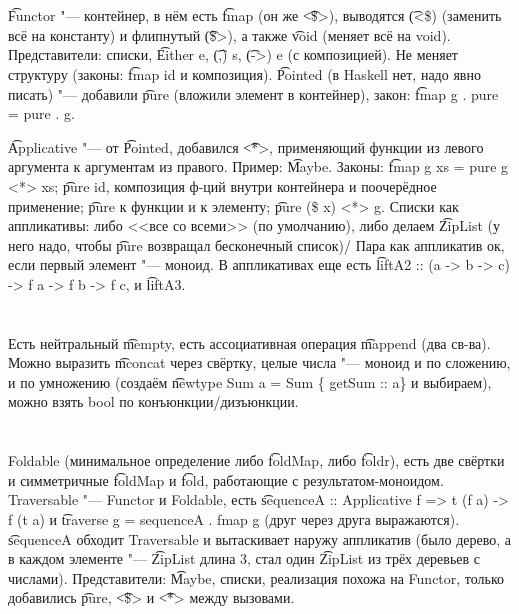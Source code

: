 \section{} %
\t{Functor} "--- контейнер, в нём есть \t{fmap} (он же \t{<\$>}), выводятся \t{(<\$)} (заменить всё на константу) и флипнутый
\t{(\$>)}, а также \t{void} (меняет всё на void).
Представители: списки, \t{Either e}, \t{(,) s}, \t{(->) e} (с композицией).
Не меняет структуру (законы: \t{fmap id} и композиция).
\t{Pointed} (в Haskell нет, надо явно писать) "--- добавили \t{pure} (вложили элемент в контейнер), закон: \t{fmap g . pure = pure . g}.

\t{Applicative} "--- от \t{Pointed}, добавился \t{<*>}, применяющий функции из левого аргумента к аргументам из правого.
Пример: \t{Maybe}.
Законы: \t{fmap g xs = pure g <*> xs}; \t{pure id}, композиция ф-ций внутри контейнера и поочерёдное применение;
\t{pure} к функции и к элементу; \t{pure (\$ x) <*> g}.
Списки как аппликативы: либо <<все со всеми>> (по умолчанию), либо делаем \t{ZipList} (у него надо, чтобы \t{pure} возвращал бесконечный список)/
Пара как аппликатив ок, если первый элемент "--- моноид.
В аппликативах еще есть \t{liftA2 :: (a -> b -> c) -> f a -> f b -> f c}, и \t{liftA3}.

\section{} %
Есть нейтральный \t{mempty}, есть ассоциативная операция \t{mappend} (два св-ва).
Можно выразить \t{mconcat} через свёртку, целые числа "--- моноид и по сложению,
и по умножению (создаём \t{newtype Sum a = Sum \{ getSum :: a\}} и выбираем),
можно взять bool по конъюнкции/дизъюнкции.

\section{} %
Foldable (минимальное определение либо \t{foldMap}, либо \t{foldr}), есть две свёртки и симметричные
\t{foldMap} и \t{fold}, работающие с результатом-моноидом.
Traversable "--- Functor и Foldable, есть \t{sequenceA :: Applicative f => t (f a) -> f (t a)} и \t{traverse g = sequenceA . fmap g} (друг через друга выражаются).
\t{sequenceA} обходит Traversable и вытаскивает наружу аппликатив (было дерево, а в каждом элементе "--- \t{ZipList} длина 3, стал один \t{ZipList} из трёх деревьев с числами).
Представители: \t{Maybe}, списки, реализация похожа на Functor, только добавились \t{pure}, \t{<\$>} и \t{<*>} между вызовами.


